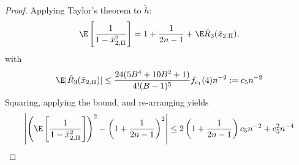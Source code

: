 \begin{proof}
  Applying Taylor's theorem to $\tilde{h}$:
  \begin{equation*}
    \E \left [ \frac{1}{1-\bar{x}_{2,\Pi}^2} \right ]
    = 1 + \frac{1}{2n-1} + \E \tilde{R}_3(\bar{x}_{2,\Pi}),
  \end{equation*}
  with
  \begin{equation*}
    \E |\tilde{R}_3(\bar{x}_{2,\Pi})| \leq \frac{24(5B^4 + 10B^2 + 1)}{4!(B-1)^5}f_{c_1}(4) n^{-2}
    := c_5 n^{-2}
  \end{equation*}
  Squaring, applying the bound, and re-arranging yields
  \begin{equation*}
    \left | \left ( \E \left [ \frac{1}{1-\bar{x}_{2,\Pi}^2} \right ] \right )^2
      - \left ( 1 + \frac{1}{2n-1} \right )^2 \right | \leq
    2 \left ( 1 + \frac{1}{2n-1} \right ) c_5 n^{-2} + c_5^2 n^{-4}
  \end{equation*}


\end{proof}
